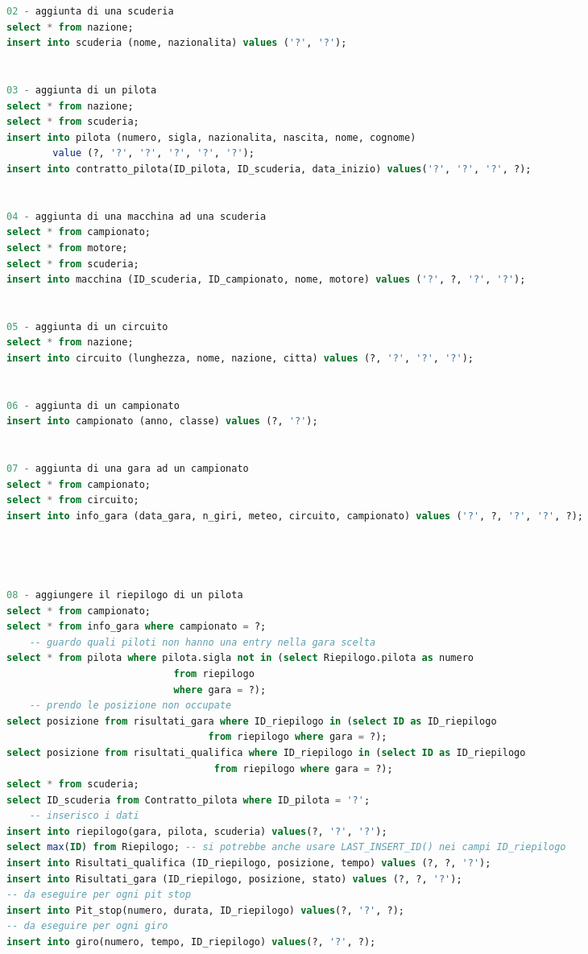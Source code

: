 \documentclass[a4paper,12pt]{report}
\begin{document}
{\begin{adjustwidth}{-85pt}{1pt}
\begin{lstlisting}[language=SQL]
02 - aggiunta di una scuderia
select * from nazione;
insert into scuderia (nome, nazionalita) values ('?', '?');


03 - aggiunta di un pilota
select * from nazione;
select * from scuderia;
insert into pilota (numero, sigla, nazionalita, nascita, nome, cognome) 
		value (?, '?', '?', '?', '?', '?');
insert into contratto_pilota(ID_pilota, ID_scuderia, data_inizio) values('?', '?', '?', ?);


04 - aggiunta di una macchina ad una scuderia
select * from campionato;
select * from motore;
select * from scuderia;
insert into macchina (ID_scuderia, ID_campionato, nome, motore) values ('?', ?, '?', '?');


05 - aggiunta di un circuito
select * from nazione;
insert into circuito (lunghezza, nome, nazione, citta) values (?, '?', '?', '?');


06 - aggiunta di un campionato
insert into campionato (anno, classe) values (?, '?');


07 - aggiunta di una gara ad un campionato
select * from campionato;
select * from circuito;
insert into info_gara (data_gara, n_giri, meteo, circuito, campionato) values ('?', ?, '?', '?', ?);




08 - aggiungere il riepilogo di un pilota
select * from campionato;
select * from info_gara where campionato = ?;
	-- guardo quali piloti non hanno una entry nella gara scelta
select * from pilota where pilota.sigla not in (select Riepilogo.pilota as numero 
						     from riepilogo 
						     where gara = ?);
	-- prendo le posizione non occupate
select posizione from risultati_gara where ID_riepilogo in (select ID as ID_riepilogo 
								   from riepilogo where gara = ?);
select posizione from risultati_qualifica where ID_riepilogo in (select ID as ID_riepilogo 
									from riepilogo where gara = ?);										
select * from scuderia;
select ID_scuderia from Contratto_pilota where ID_pilota = '?';
	-- inserisco i dati
insert into riepilogo(gara, pilota, scuderia) values(?, '?', '?');
select max(ID) from Riepilogo; -- si potrebbe anche usare LAST_INSERT_ID() nei campi ID_riepilogo
insert into Risultati_qualifica (ID_riepilogo, posizione, tempo) values (?, ?, '?');
insert into Risultati_gara (ID_riepilogo, posizione, stato) values (?, ?, '?');
-- da eseguire per ogni pit stop
insert into Pit_stop(numero, durata, ID_riepilogo) values(?, '?', ?);	
-- da eseguire per ogni giro
insert into giro(numero, tempo, ID_riepilogo) values(?, '?', ?);			
	

\end{lstlisting}
\end{adjustwidth}}
\end{document}
